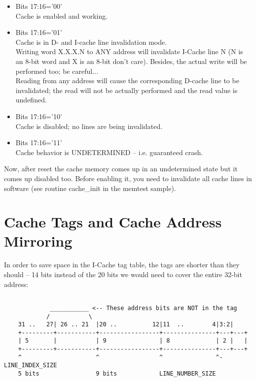     \begin{itemize}
    \item Bits 17:16='00'\\
        Cache is enabled and working.
    \item Bits 17:16='01'\\
        Cache is in D- and I-cache line invalidation mode.\\
        Writing word X.X.X.N to ANY address will 
        invalidate I-Cache line N (N is an 8-bit word and X is an 8-bit 
        don't care). Besides, the actual write will be performed too; be 
        careful...\\
    
        Reading from any address will cause the 
        corresponding D-cache line to be invalidated; the read will not be
        actually performed and the read value is undefined.\\
    \item Bits 17:16='10'\\
        Cache is disabled; no lines are being invalidated.\\
    \item Bits 17:16='11'\\
        Cache behavior is UNDETERMINED -- i.e. guaranteed crash.\\
    \end{itemize}
    
    Now, after reset the cache memory comes up in an undetermined state but 
    it comes up disabled too. Before enabling it, you need to invalidate all
    cache lines in software (see routine cache\_init in the memtest sample).\\

\section{Cache Tags and Cache Address Mirroring}
\label{cache_tags}

    In order to save space in the I-Cache tag table, the tags are shorter than 
    they should -- 14 bits instead of the 20 bits we would need to cover the
    entire 32-bit address:

\begin{verbatim}

             ___________ <-- These address bits are NOT in the tag
            /           \
    31 ..   27| 26 .. 21  |20 ..          12|11  ..        4|3:2|
    +---------+-----------+-----------------+---------------+---+---+
    | 5       |           | 9               | 8             | 2 |   |
    +---------+-----------+-----------------+---------------+---+---+
    ^                     ^                 ^               ^- LINE_INDEX_SIZE
    5 bits                9 bits            LINE_NUMBER_SIZE

    \end{verbatim}\\
    
